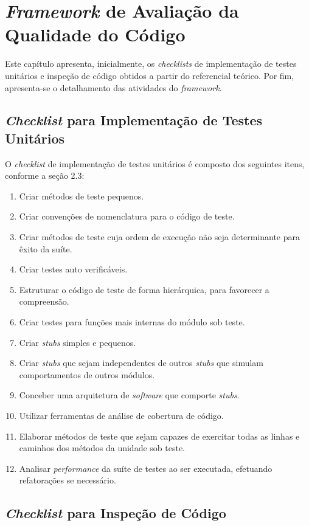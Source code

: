 \chapter{\textit{Framework} de Avaliação da Qualidade do Código}

Este capítulo apresenta, inicialmente, os \textit{checklists} de implementação de testes unitários e inspeção de código obtidos a partir do referencial teórico. Por fim, apresenta-se o detalhamento das atividades do \textit{framework}.

\section{\textit{Checklist} para Implementação de Testes Unitários}

O \textit{checklist} de implementação de testes unitários é composto dos seguintes itens, conforme a seção 2.3:

\begin{enumerate}
	\item Criar métodos de teste pequenos.
	\item Criar convenções de nomenclatura para o código de teste.
	\item Criar métodos de teste cuja ordem de execução não seja determinante para êxito da suíte.
	\item Criar testes auto verificáveis.
	\item Estruturar o código de teste de forma hierárquica, para favorecer a compreensão.
	\item Criar testes para funções mais internas do módulo sob teste.
	\item Criar \textit{stubs} simples e pequenos.
	\item Criar \textit{stubs} que sejam independentes de outros \textit{stubs} que simulam comportamentos de outros módulos.
	\item Conceber uma arquitetura de \textit{software} que comporte \textit{stubs}.
	\item Utilizar ferramentas de análise de cobertura de código.
	\item Elaborar métodos de teste que sejam capazes de exercitar todas as linhas e caminhos dos métodos da unidade sob teste.
	\item Analisar \textit{performance} da suíte de testes ao ser executada, efetuando refatorações se necessário.
\end{enumerate}

\section{\textit{Checklist} para Inspeção de Código}


